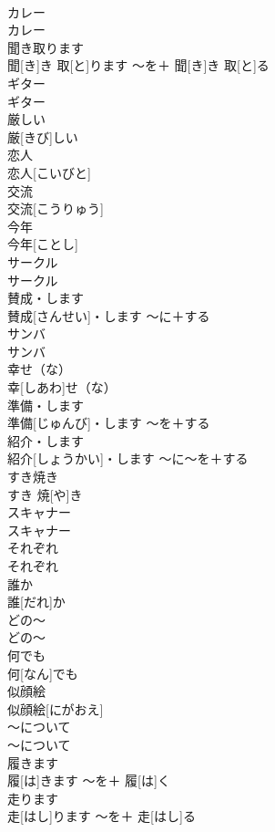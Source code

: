 \documentclass[8pt]{extreport}
\begin{document}
\begin{CJK}{UTF8}{min}
\\	カレー	
\\	カレー		
\\	聞き取ります	
\\	聞[き]き 取[と]ります	〜を＋ 聞[き]き 取[と]る	
\\	ギター	
\\	ギター		
\\	厳しい	
\\	厳[きび]しい		
\\	恋人	
\\	恋人[こいびと]		
\\	交流	
\\	交流[こうりゅう]		
\\	今年	
\\	今年[ことし]		
\\	サークル	
\\	サークル		
\\	賛成・します	
\\	賛成[さんせい]・します	〜に＋する	
\\	サンバ	
\\	サンバ		
\\	幸せ（な）	
\\	幸[しあわ]せ（な）		
\\	準備・します	
\\	準備[じゅんび]・します	〜を＋する	
\\	紹介・します	
\\	紹介[しょうかい]・します	〜に〜を＋する	
\\	すき焼き	
\\	すき 焼[や]き		
\\	スキャナー	
\\	スキャナー		
\\	それぞれ	
\\	それぞれ		
\\	誰か	
\\	誰[だれ]か		
\\	どの〜	
\\	どの〜		
\\	何でも	
\\	何[なん]でも		
\\	似顔絵	
\\	似顔絵[にがおえ]		
\\	〜について	
\\	〜について		
\\	履きます	
\\	履[は]きます	〜を＋ 履[は]く	
\\	走ります	
\\	走[はし]ります	〜を＋ 走[はし]る	

\end{CJK}
\end{document}
